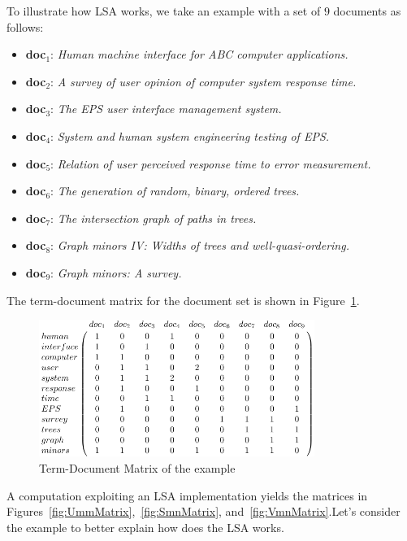 
To illustrate how LSA works, we take an example with a set of $9$ documents as follows: %

\begin{itemize}
	\item \textbf{doc}$_1$: \emph{Human machine interface for ABC computer applications.}
	\item \textbf{doc}$_2$: \emph{A survey of user opinion of computer system response time.}
	\item \textbf{doc}$_3$: \emph{The EPS user interface management system.}
	\item \textbf{doc}$_4$: \emph{System and human system engineering testing of EPS.}
	\item \textbf{doc}$_5$: \emph{Relation of user perceived response time to error measurement.}
	\item \textbf{doc}$_6$: \emph{The generation of random, binary, ordered trees.}
	\item \textbf{doc}$_7$: \emph{The intersection graph of paths in trees.}
	\item \textbf{doc}$_8$: \emph{Graph minors IV: Widths of trees and well-quasi-ordering.}
	\item \textbf{doc}$_9$: \emph{Graph minors: A survey.}
\end{itemize}

The term-document matrix for the document set is shown in Figure~\ref{fig:TermDocumentMatrix}.

\begin{figure}[h!]
	\centering
	\includegraphics[width=0.8\textwidth]{images/TermDocumentMatrix.pdf}
	\caption{Term-Document Matrix of the example}
	\label{fig:TermDocumentMatrix}
\end{figure}

A computation exploiting an LSA implementation yields the matrices in Figures~\ref{fig:UmmMatrix},~\ref{fig:SmnMatrix}, and~\ref{fig:VmnMatrix}.Let's consider the \cite{Landauer1998} example to better explain how does the LSA works.

